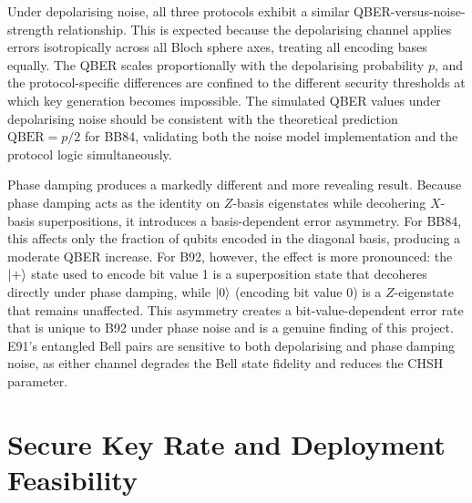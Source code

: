 \documentclass[10pt, a4paper]{report}
\begin{document}
Under depolarising noise, all three protocols exhibit a similar QBER-versus-noise-strength relationship. This is expected because the depolarising channel applies errors isotropically across all Bloch sphere axes, treating all encoding bases equally. The QBER scales proportionally with the depolarising probability $p$, and the protocol-specific differences are confined to the different security thresholds at which key generation becomes impossible. The simulated QBER values under depolarising noise should be consistent with the theoretical prediction $\text{QBER} = p/2$ for BB84, validating both the noise model implementation and the protocol logic simultaneously.

Phase damping produces a markedly different and more revealing result. Because phase damping acts as the identity on $Z$-basis eigenstates while decohering $X$-basis superpositions, it introduces a basis-dependent error asymmetry. For BB84, this affects only the fraction of qubits encoded in the diagonal basis, producing a moderate QBER increase. For B92, however, the effect is more pronounced: the $\ket{+}$ state used to encode bit value 1 is a superposition state that decoheres directly under phase damping, while $\ket{0}$ (encoding bit value 0) is a $Z$-eigenstate that remains unaffected. This asymmetry creates a bit-value-dependent error rate that is unique to B92 under phase noise and is a genuine finding of this project. E91's entangled Bell pairs are sensitive to both depolarising and phase damping noise, as either channel degrades the Bell state fidelity and reduces the CHSH parameter.




\section{Secure Key Rate and Deployment Feasibility}

\end{document}
